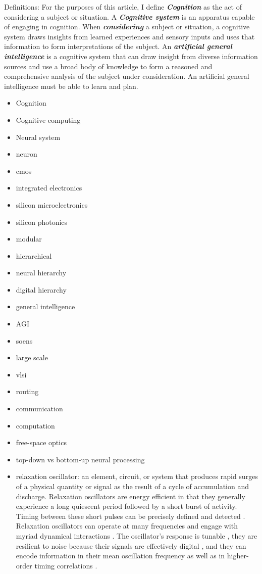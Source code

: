 Definitions: For the purposes of this article, I define \textbf{\textit{Cognition}} as the act of considering a subject or situation. A \textbf{\textit{Cognitive system}} is an apparatus capable of engaging in cognition. When \textbf{\textit{considering}} a subject or situation, a cognitive system draws insights from learned experiences and sensory inputs and uses that information to form interpretations of the subject. An \textbf{\textit{artificial general intelligence}} is a cognitive system that can draw insight from diverse information sources and use a broad body of knowledge to form a reasoned and comprehensive analysis of the subject under consideration. An artificial general intelligence must be able to learn and plan.

\vspace{3em}
\begin{itemize}
\item Cognition
\item Cognitive computing
\item Neural system
\item neuron
\item cmos
\item integrated electronics
\item silicon microelectronics
\item silicon photonics
\item modular 
\item hierarchical
\item neural hierarchy
\item digital hierarchy
\item general intelligence
\item AGI
\item soens
\item large scale
\item vlsi
\item routing
\item communication
\item computation
\item free-space optics
\item top-down vs bottom-up neural processing
\item relaxation oscillator: an element, circuit, or system that produces rapid surges of a physical quantity or signal as the result of a cycle of accumulation and discharge. Relaxation oscillators are energy efficient in that they generally experience a long quiescent period followed by a short burst of activity. Timing between these short pulses can be precisely defined and detected \cite{bu2006}. Relaxation oscillators can operate at many frequencies \cite{huya2000} and engage with myriad dynamical interactions \cite{lued1997}. The oscillator's response is tunable \cite{huya2000}, they are resilient to noise because their signals are effectively digital \cite{stgo2005}, and they can encode information in their mean oscillation frequency as well as in higher-order timing correlations \cite{pasc1999,thde2001,sase2001,stse2007,brcl2010,haah2015}.
\end{itemize}




